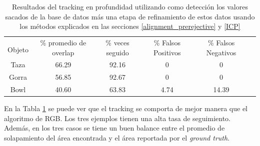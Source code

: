 \begin{table}[h]
	\centering
    \begin{tabular}{|c|c|c|c|c|c|}
    \hline
    & \multirow{2}{2.4cm}{\% promedio de overlap} & \multirow{2}{2cm}{\% veces seguido} & \multirow{2}{1.6cm}{\% Falsos Positivos} & \multirow{2}{1.6cm}{\% Falsos Negativos}\\
	Objeto & & & &\\
    \hline
    Taza   & 66.29      & 92.16      & 0      & 0     \\
    \hline
    Gorra  & 56.85      & 92.67      & 0      & 0     \\
    \hline
    Bowl   & 40.60      & 63.83      & 4.74   & 14.39 \\
    \hline
    \end{tabular}
\caption{Resultados del tracking en profundidad utilizando como detección los valores sacados de la base de datos más una etapa de refinamiento de estos datos usando los métodos explicados en las secciones \ref{alignment_prerejective} y \ref{ICP}}
\label{tabla_d}
\end{table}

En la Tabla \ref{tabla_d} se puede ver que el tracking se comporta de mejor manera que el algoritmo de RGB. Los tres ejemplos tienen una alta tasa de seguimiento. Además, en los tres casos se tiene un buen balance entre el promedio de solapamiento del área encontrada y el área reportada por el \textit{ground truth}.


